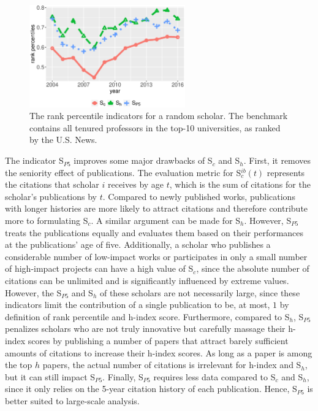 \begin{figure}[ht!]
    \centering
    \includegraphics[width=0.6\textwidth]{figures/compare_autrp/auti.eps}
    \caption[rank percentile indicators for a random scholar]{The rank percentile indicators for a random scholar. The benchmark contains all tenured professors in the top-10 universities, as ranked by the U.S. News.}
    \label{fig:auti}
\end{figure}

The indicator S$_{P5}$ improves some major drawbacks of S$_c$ and S$_h$. First, it removes the seniority effect of publications. The evaluation metric for S$_c^{ib}(t)$ represents the citations that scholar $i$ receives by age $t$, which is the sum of citations for the scholar's publications by $t$. Compared to newly published works, publications with longer histories are more likely to attract citations and therefore contribute more to formulating S$_c$. A similar argument can be made for S$_h$. However, S$_{P5}$ treats the publications equally and evaluates them based on their performances at the publications' age of five. Additionally, a scholar who publishes a considerable number of low-impact works or participates in only a small number of high-impact projects can have a high value of S$_c$, since the absolute number of citations can be unlimited and is significantly influenced by extreme values. However, the S$_{P5}$ and S$_h$ of these scholars are not necessarily large, since these indicators limit the contribution of a single publication to be, at most, $1$ by definition of rank percentile and h-index score. Furthermore, compared to S$_h$, S$_{P5}$ penalizes scholars who are not truly innovative but carefully massage their h-index scores by publishing a number of papers that attract barely sufficient amounts of citations to increase their h-index scores. As long as a paper is among the top $h$ papers, the actual number of citations is irrelevant for h-index and S$_h$, but it can still impact S$_{P5}$. Finally, S$_{P5}$ requires less data compared to S$_c$ and S$_h$, since it only relies on the 5-year citation history of each publication. Hence, S$_{P5}$ is better suited to large-scale analysis.

